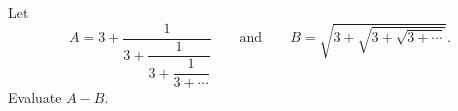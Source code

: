 Let
\[
A=3+\dfrac{1}{3+\dfrac{1}{3+\dfrac{1}{3+\cdots}}}\qquad\text{and}\qquad B=\sqrt{3+\sqrt{3+\sqrt{3+\cdots}}}.
\]
Evaluate $A-B$.

